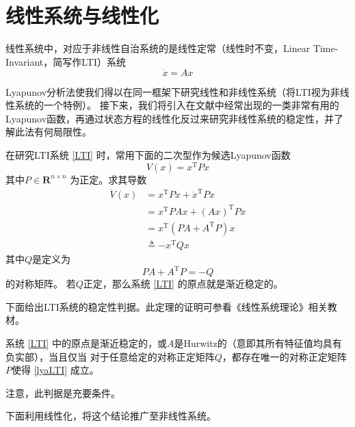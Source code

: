 \section{线性系统与线性化}\label{2Eref}
线性系统中，对应于非线性自治系统的是线性定常（线性时不变，Linear Time-Invariant，简写作LTI）系统
\begin{equation}\label{LTI}
    \dot{x}=Ax
\end{equation}
\begin{note}
    Lyapunov分析法使我们得以在同一框架下研究线性和非线性系统（将LTI视为非线性系统的一个特例）。
    接下来，我们将引入在文献中经常出现的一类非常有用的Lyapunov函数，再通过状态方程的线性化反过来研究非线性系统的稳定性，并了解此法有何局限性。
\end{note}
  在研究LTI系统 \eqref{LTI} 时，常用下面的二次型作为候选Lyapunov函数
  \[ V (x) = x^\mathrm{T} P  x \]
  其中$P \in \mathbf{R}^{n \times n}$ 为正定。求其导数
  \begin{align*}
    \dot{V}(x)&= x^\mathrm{T}P\dot{x}+\dot{x}^\mathrm{T}Px\\
    &=x^\mathrm{T}PAx+(Ax)^\mathrm{T}Px\\
    &=x^\mathrm{T} (P  A + A^\mathrm{T} P) x \\
    &\triangleq - x^\mathrm{T} Q  x
  \end{align*}
  其中$Q$是定义为
  \begin{equation}
    P  A + A^\mathrm{T} P = - Q \label{lyaLTI}
  \end{equation}
  的对称矩阵。
  若$Q$正定，那么系统 \eqref{LTI} 的原点就是渐近稳定的。

  下面给出LTI系统的稳定性判据。此定理的证明可参看《线性系统理论》相关教材。
  
  \begin{theorem}[线性定常系统的稳定性判据]\label{linearlya}
    系统 \eqref{LTI} 中的原点是渐近稳定的，或$A$是Hurwitz的（意即其所有特征值均具有负实部），当且仅当
    对于任意给定的对称正定矩阵$Q$，都存在唯一的对称正定矩阵$P$使得 \eqref{lyaLTI} 成立。
  \end{theorem}
  \begin{note}
    注意，此判据是充要条件。
  \end{note}
  
  下面利用线性化，将这个结论推广至非线性系统。

